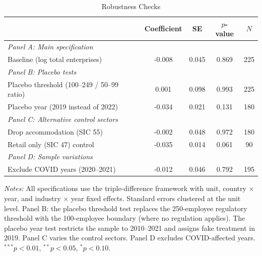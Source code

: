 \begin{table}[!t]
\centering
\caption{Robustness Checks}
\label{tab:robustness}
\begin{tabular}{lcccc}
\hline\hline
 & Coefficient & SE & $p$-value & $N$ \\
\hline
\multicolumn{5}{l}{\textit{Panel A: Main specification}} \\[3pt]
Baseline (log total enterprises) & -0.008 & 0.045 & 0.869 & 225 \\[6pt]
\multicolumn{5}{l}{\textit{Panel B: Placebo tests}} \\[3pt]
Placebo threshold (100--249 / 50--99 ratio) & 0.001 & 0.098 & 0.993 & 225 \\
Placebo year (2019 instead of 2022) & -0.034 & 0.021 & 0.131 & 180 \\[6pt]
\multicolumn{5}{l}{\textit{Panel C: Alternative control sectors}} \\[3pt]
Drop accommodation (SIC 55) & -0.002 & 0.048 & 0.972 & 180 \\
Retail only (SIC 47) control & -0.035 & 0.014 & 0.061 & 90 \\[6pt]
\multicolumn{5}{l}{\textit{Panel D: Sample variations}} \\[3pt]
Exclude COVID years (2020--2021) & -0.012 & 0.046 & 0.792 & 195 \\
\hline\hline
\end{tabular}
\begin{tablenotes}[flushleft]
\small
\item \textit{Notes:} All specifications use the triple-difference framework 
with unit, country $\times$ year, and industry $\times$ year fixed effects. 
Standard errors clustered at the unit level. Panel B: the placebo threshold test 
replaces the 250-employee regulatory threshold with the 100-employee boundary 
(where no regulation applies). The placebo year test restricts the sample to 
2010--2021 and assigns fake treatment in 2019. Panel C varies the control sectors. 
Panel D excludes COVID-affected years. $^{***}p<0.01$, $^{**}p<0.05$, $^{*}p<0.10$.
\end{tablenotes}
\end{table}
